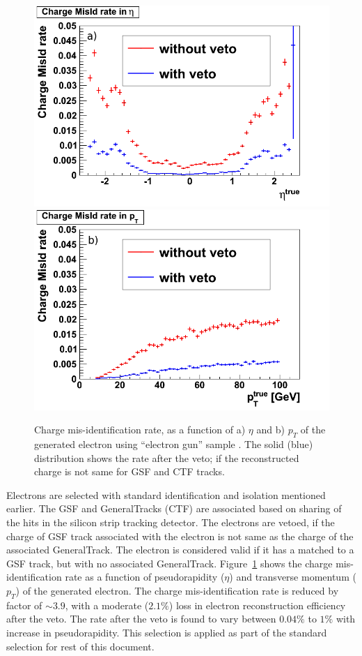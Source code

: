 \begin{figure}[htb]
\begin{center}
\includegraphics[width=0.485\linewidth,height=0.37\linewidth]{figs/ChargeMisIdRateEta.png}
\includegraphics[width=0.485\linewidth,height=0.37\linewidth]{figs/ChargeMisIdRatePt.png}
\caption{Charge mis-identification rate, as a function of a) $\eta$ and b) $p_T$ of the generated
electron using ``electron gun'' sample \label{fig:charge_misid}. The solid (blue) distribution shows
the rate after the veto; if the reconstructed charge is not same for GSF and CTF tracks.}
\end{center}
\end{figure}
Electrons are selected with standard identification and isolation mentioned earlier. The GSF and GeneralTracks 
(CTF) are associated based on sharing of the hits in the silicon strip tracking detector. 
The electrons are vetoed, if the charge of GSF track associated with the electron is not same 
as the charge of the associated GeneralTrack. The electron is considered valid if it has a matched
to a GSF track, but with no associated GeneralTrack. Figure~\ref{fig:charge_misid} shows the charge mis-identification 
rate as a function of pseudorapidity ($\eta$) and transverse momentum ($p_T$) of the generated electron. The charge 
mis-identification rate is reduced by factor of $\sim 3.9$, with a moderate ($2.1\%$)  loss in electron reconstruction 
efficiency after the veto. The rate after the veto is found to vary between $0.04\%$ to $1\%$ with increase in 
pseudorapidity. This selection is applied as part of the standard selection for rest of this document.
